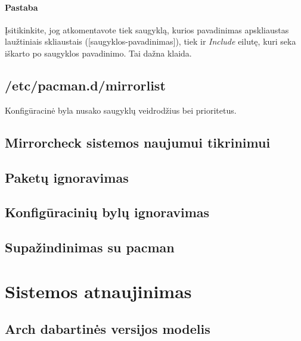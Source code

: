       \paragraph{Pastaba} Įsitikinkite, jog atkomentavote tiek
      saugyklą, kurios pavadinimas apskliaustas laužtiniais
      skliaustais ([saugyklos-pavadinimas]), tiek ir \textsl{Include} eilutę, kuri seka
      iškarto po saugyklos pavadinimo. Tai dažna klaida.

    \subsection{/etc/pacman.d/mirrorlist}

      Konfigūracinė byla nusako saugyklų veidrodžius bei prioritetus.

    \subsection{Mirrorcheck sistemos naujumui tikrinimui}

    \subsection{Paketų ignoravimas}

    \subsection{Konfigūracinių bylų ignoravimas}

    \subsection{Supažindinimas su pacman}

    \section{Sistemos atnaujinimas}

      \subsection{Arch dabartinės versijos modelis}

